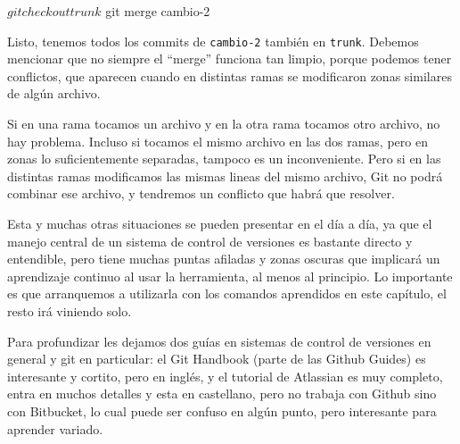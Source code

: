 \begin{shell}
$ git checkout trunk
$ git merge cambio-2
\end{shell}

Listo, tenemos todos los commits de \verb|cambio-2| también en \verb|trunk|. Debemos mencionar que no siempre el ``merge'' funciona tan limpio, porque podemos tener conflictos, que aparecen cuando en distintas ramas se modificaron zonas similares de algún archivo.

Si en una rama tocamos un archivo y en la otra rama tocamos otro archivo, no hay problema. Incluso si tocamos el mismo archivo en las dos ramas, pero en zonas lo suficientemente separadas, tampoco es un inconveniente. Pero si en las distintas ramas modificamos las mismas lineas del mismo archivo, Git no podrá combinar ese archivo, y tendremos un conflicto que habrá que resolver. 

Esta y muchas otras situaciones se pueden presentar en el día a día, ya que el manejo central de un sistema de control de versiones es bastante directo y entendible, pero tiene muchas puntas afiladas y zonas oscuras que implicará un aprendizaje continuo al usar la herramienta, al menos al principio. Lo importante es que arranquemos a utilizarla con los comandos aprendidos en este capítulo, el resto irá viniendo solo.

Para profundizar les dejamos dos guías en sistemas de control de versiones en general y git en particular: el Git Handbook \cite{git-tuto-github-handbook} (parte de las Github Guides) es interesante y cortito, pero en inglés, y el tutorial de Atlassian \cite{git-tuto-atlassian} es muy completo, entra en muchos detalles y esta en castellano, pero no trabaja con Github sino con Bitbucket, lo cual puede ser confuso en algún punto, pero interesante para aprender variado.
